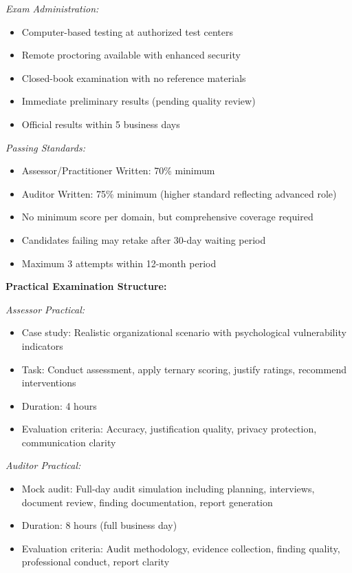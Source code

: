 \documentclass[11pt,a4paper]{article}
\begin{document}
\textit{Exam Administration:}
\begin{itemize}
\item Computer-based testing at authorized test centers
\item Remote proctoring available with enhanced security
\item Closed-book examination with no reference materials
\item Immediate preliminary results (pending quality review)
\item Official results within 5 business days
\end{itemize}

\textit{Passing Standards:}
\begin{itemize}
\item Assessor/Practitioner Written: 70\% minimum
\item Auditor Written: 75\% minimum (higher standard reflecting advanced role)
\item No minimum score per domain, but comprehensive coverage required
\item Candidates failing may retake after 30-day waiting period
\item Maximum 3 attempts within 12-month period
\end{itemize}

\textbf{Practical Examination Structure:}

\textit{Assessor Practical:}
\begin{itemize}
\item Case study: Realistic organizational scenario with psychological vulnerability indicators
\item Task: Conduct assessment, apply ternary scoring, justify ratings, recommend interventions
\item Duration: 4 hours
\item Evaluation criteria: Accuracy, justification quality, privacy protection, communication clarity
\end{itemize}

\textit{Auditor Practical:}
\begin{itemize}
\item Mock audit: Full-day audit simulation including planning, interviews, document review, finding documentation, report generation
\item Duration: 8 hours (full business day)
\item Evaluation criteria: Audit methodology, evidence collection, finding quality, professional conduct, report clarity
\end{itemize}
\end{document}
